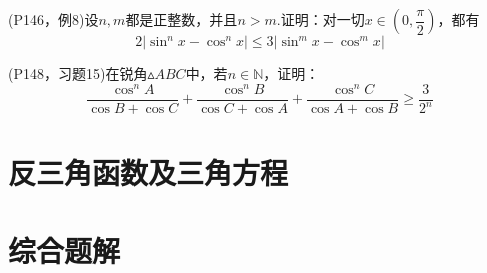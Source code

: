 \documentclass[cn,hazy,black,10pt,normal]{elegantnote}
\newcommand{\ssb}[1]{\left( #1 \right)}
\begin{document}
\vspace{23em}

\begin{problem}
	(P146，例8)设$n,m$都是正整数，并且$n>m$.证明：对一切$x \in \ssb{ 0,\dfrac{\pi}{2} }$，都有$$2|\sin ^n x - \cos ^n x| \leq 3|\sin ^m x - \cos ^m x|$$
\end{problem}

\newpage
\begin{problem}
	(P148，习题15)在锐角$\vartriangle ABC$中，若$n \in \mathbb{N}$，证明：$$\frac{\cos ^n A}{\cos B + \cos C} + \frac{\cos ^n B}{\cos C + \cos A} + \frac{\cos ^n C}{\cos A + \cos B} \geq \frac{3}{2^n}$$
\end{problem}

\newpage
\section{反三角函数及三角方程}
\section{综合题解}
\end{document}

